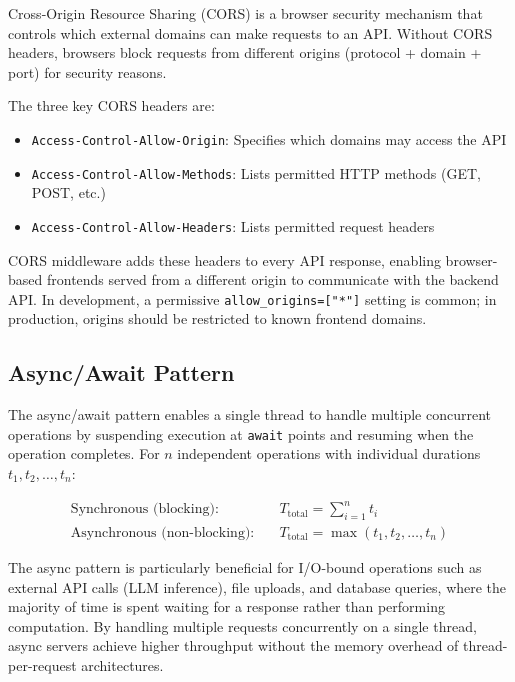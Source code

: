 \documentclass[10pt,a4paper]{article}
\begin{document}
Cross-Origin Resource Sharing (CORS) is a browser security mechanism that controls which external domains can make requests to an API. Without CORS headers, browsers block requests from different origins (protocol + domain + port) for security reasons.

The three key CORS headers are:

\begin{itemize}
    \item \texttt{Access-Control-Allow-Origin}: Specifies which domains may access the API
    \item \texttt{Access-Control-Allow-Methods}: Lists permitted HTTP methods (GET, POST, etc.)
    \item \texttt{Access-Control-Allow-Headers}: Lists permitted request headers
\end{itemize}

CORS middleware adds these headers to every API response, enabling browser-based frontends served from a different origin to communicate with the backend API. In development, a permissive \texttt{allow\_origins=["*"]} setting is common; in production, origins should be restricted to known frontend domains.

\subsection{Async/Await Pattern}
\label{sec:async-await}

The async/await pattern enables a single thread to handle multiple concurrent operations by suspending execution at \texttt{await} points and resuming when the operation completes. For $n$ independent operations with individual durations $t_1, t_2, \ldots, t_n$:

\begin{align}
\text{Synchronous (blocking):} \quad & T_{\text{total}} = \sum_{i=1}^{n} t_i \label{eq:sync-time} \\
\text{Asynchronous (non-blocking):} \quad & T_{\text{total}} = \max(t_1, t_2, \ldots, t_n) \label{eq:async-time}
\end{align}

The async pattern is particularly beneficial for I/O-bound operations such as external API calls (LLM inference), file uploads, and database queries, where the majority of time is spent waiting for a response rather than performing computation. By handling multiple requests concurrently on a single thread, async servers achieve higher throughput without the memory overhead of thread-per-request architectures.
\end{document}
